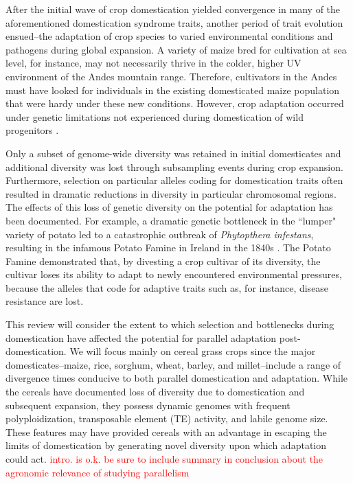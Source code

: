 \documentclass[12pt]{article}
\newcommand{\mbh}[1]{\textcolor{red}{\normalsize  #1}}
\begin{document}
After the initial wave of crop domestication yielded convergence in many of the aforementioned domestication syndrome traits, another period of trait evolution ensued--the adaptation of crop species to varied environmental conditions and pathogens during global expansion.
A variety of maize bred for cultivation at sea level, for instance, may not necessarily thrive in the colder, higher UV environment of the Andes mountain range.
Therefore, cultivators in the Andes must have looked for individuals in the existing domesticated maize population that were hardy under these new conditions.
However, crop adaptation occurred under genetic limitations not experienced during domestication of wild progenitors \citep{Wang2017}. 

Only a subset of genome-wide diversity was retained in initial domesticates and additional diversity was lost through subsampling events during crop expansion.
Furthermore, selection on particular alleles coding for domestication traits often resulted in dramatic reductions in diversity in particular chromosomal regions.
The effects of this loss of genetic diversity on the potential for adaptation has been documented.
For example, a dramatic genetic bottleneck in the ``lumper" variety of potato led to a catastrophic outbreak of \emph{Phytopthera infestans}, resulting in the infamous Potato Famine in Ireland in the 1840s \citep{Goodwin1994}.
The Potato Famine demonstrated that, by divesting a crop cultivar of its diversity, the cultivar loses its ability to adapt to newly encountered environmental pressures, because the alleles that code for adaptive traits such as, for instance, disease resistance are lost.

This review will consider the extent to which selection and bottlenecks during domestication have affected the potential for parallel adaptation post-domestication.
We will focus mainly on cereal grass crops since the major domesticates--maize, rice, sorghum, wheat, barley, and millet--include a range of divergence times conducive to both parallel domestication and adaptation.
While the cereals have documented loss of diversity due to domestication and subsequent expansion, they possess dynamic genomes with frequent polyploidization, transposable element (TE) activity, and labile genome size.
These features may have provided cereals with an advantage in escaping the limits of domestication by generating novel diversity upon which adaptation could act.
\mbh{intro. is o.k.}
\mbh{be sure to include summary in conclusion about the agronomic relevance of studying parallelism}
\end{document}
